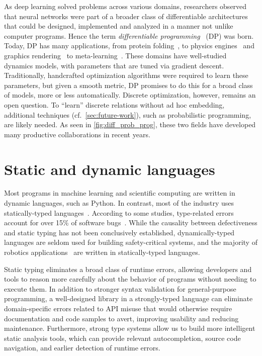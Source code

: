 \documentclass[12pt,initial,twoside,maitrise]{dms}
\numberwithin{equation}{section}
\numberwithin{table}{chapter}
\numberwithin{figure}{chapter}
\begin{document}
As deep learning solved problems across various domains, researchers observed that neural networks were part of a broader class of differentiable architectures that could be designed, implemented and analyzed in a manner not unlike computer programs. Hence the term \textit{differentiable programming}~\citep{olah2015neural} (DP) was born. Today, DP has many applications, from protein folding~\citep{alquraishi2018end}, to physics engines~\citep{de2018end, degrave2016differentiable} and graphics rendering~\citep{loper2014opendr} to meta-learning~\citep{liu2018darts}. These domains have well-studied dynamics models, with parameters that are tuned via gradient descent. Traditionally, handcrafted optimization algorithms were required to learn these parameters, but given a smooth metric, DP promises to do this for a broad class of models, more or less automatically. Discrete optimization, however, remains an open question. To ``learn'' discrete relations without ad hoc embedding, additional techniques (cf.~\autoref{sec:future-work}), such as probabilistic programming, are likely needed. As seen in \autoref{fig:diff_prob_prog}, these two fields have developed many productive collaborations in recent years.

\section{Static and dynamic languages}

Most programs in machine learning and scientific computing are written in dynamic languages, such as Python. In contrast, most of the industry uses statically-typed languages~\citep{github}. According to some studies, type-related errors account for over 15\% of software bugs~\citep{gao2017type}. While the causality between defectiveness and static typing has not been conclusively established, dynamically-typed languages are seldom used for building safety-critical systems, and the majority of robotics applications~\citep{Areserio54:online} are written in statically-typed languages.

Static typing eliminates a broad class of runtime errors, allowing developers and tools to reason more carefully about the behavior of programs without needing to execute them. In addition to stronger syntax validation for general-purpose programming, a well-designed library in a strongly-typed language can eliminate domain-specific errors related to API misuse that would otherwise require documentation and code samples to avert, improving usability and reducing maintenance. Furthermore, strong type systems allow us to build more intelligent static analysis tools, which can provide relevant autocompletion, source code navigation, and earlier detection of runtime errors.
\end{document}
